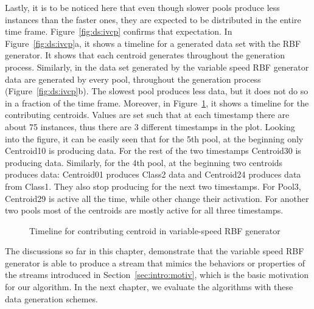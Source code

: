 Lastly, it is to be noticed here that even though slower pools produce less instances than the faster ones, they are expected to be distributed in the entire time frame. Figure~\ref{fig:ds:ivcp} confirms that expectation. In Figure~\ref{fig:ds:ivcp}a, it shows a timeline for a generated data set with the RBF generator. It shows that each centroid generates throughout the generation process. Similarly, in the data set generated by the variable speed RBF generator data are generated by every pool, throughout the generation process (Figure~\ref{fig:ds:ivcp}b). The slowest pool produces less data, but it does not do so in a fraction of the time frame. Moreover, in Figure~\ref{fig:ds:ivsc}, it shows a timeline for the contributing centroids. Values are set such that at each timestamp there are about 75 instances, thus there are 3 different timestamps in the plot. Looking into the figure, it can be easily seen that for the 5th pool, at the beginning only Centroid10 is producing data. For the rest of the two timestamps Centroid30 is producing data. Similarly, for the 4th pool, at the beginning two centroids produces data: Centroid01 produces Class2 data and Centroid24 produces data from Class1. They also stop producing for the next two timestamps. For Pool3, Centroid29 is active all the time, while other change their activation. For another two pools most of the centroids are mostly active for all three timestamps.


\begin{figure}[htbp] 
    \begin{center}
        \caption{Timeline for contributing centroid in variable-speed RBF generator}
        \label{fig:ds:ivsc}
    \end{center}
\end{figure}



The discussions so far in this chapter, demonstrate that the variable speed RBF generator is able to produce a stream that mimics the behaviors or properties of the streams introduced in Section~\ref{sec:intro:motiv}, which is the basic motivation for our algorithm. In the next chapter, we evaluate the algorithms with these data generation schemes.
